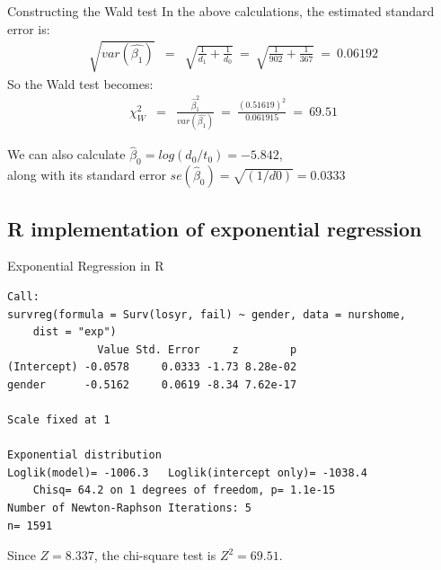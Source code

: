 \documentclass[envcountsect, 10pt, portrait, palatino]{beamer}
\begin{document}
\begin{frame}{Constructing the Wald test}
In the above calculations, the estimated standard error is:
\begin{eqnarray*}
\sqrt{var(\hat{\beta_1})} & = & \sqrt{\frac{1}{d_1} + \frac{1}{d_0}}
~=~ \sqrt{\frac{1}{902} + \frac{1}{367}}
~=~ 0.06192
\end{eqnarray*}
So the Wald test becomes:
\begin{eqnarray*}
\chi^2_W & = & \frac{\hat{\beta}_1^2}{var(\hat{\beta_1})}
 ~ = ~ \frac{(0.51619)^2}{0.061915} ~=~ 69.51
\end{eqnarray*}

\vspace{0.2in}
We can also calculate $\hat\beta_0= log(d_0/t_0) = -5.842$,\\
along with its standard error $se(\hat\beta_0)=\sqrt{(1/d0)} = 0.0333$
\end{frame} 
\subsection{R implementation of exponential regression}
\begin{frame}[fragile]{ Exponential Regression in R }

\scriptsize
\begin{verbatim}
Call:
survreg(formula = Surv(losyr, fail) ~ gender, data = nurshome,
    dist = "exp")
              Value Std. Error     z        p
(Intercept) -0.0578     0.0333 -1.73 8.28e-02
gender      -0.5162     0.0619 -8.34 7.62e-17

Scale fixed at 1

Exponential distribution
Loglik(model)= -1006.3   Loglik(intercept only)= -1038.4
	Chisq= 64.2 on 1 degrees of freedom, p= 1.1e-15
Number of Newton-Raphson Iterations: 5
n= 1591 
\end{verbatim}
\normalsize
Since $Z=8.337$, the chi-square test is $Z^2=69.51$.
\end{frame} 
\end{document}
